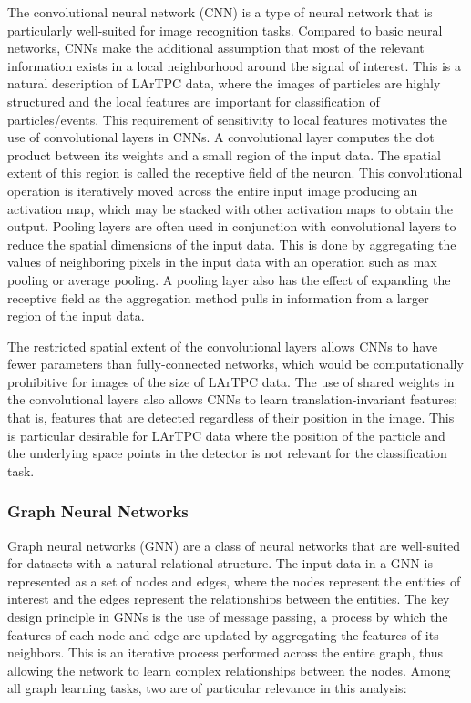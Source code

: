 The convolutional neural network (CNN) is a type of neural network that is particularly well-suited for image recognition tasks. Compared to basic neural networks, CNNs make the additional assumption that most of the relevant information exists in a local neighborhood around the signal of interest. This is a natural description of LArTPC data, where the images of particles are highly structured and the local features are important for classification of particles/events. This requirement of sensitivity to local features motivates the use of convolutional layers in CNNs. A convolutional layer computes the dot product between its weights and a small region of the input data. The spatial extent of this region is called the receptive field of the neuron. This convolutional operation is iteratively moved across the entire input image producing an activation map, which may be stacked with other activation maps to obtain the output. Pooling layers are often used in conjunction with convolutional layers to reduce the spatial dimensions of the input data. This is done by aggregating the values of neighboring pixels in the input data with an operation such as max pooling or average pooling. A pooling layer also has the effect of expanding the receptive field as the aggregation method pulls in information from a larger region of the input data.

The restricted spatial extent of the convolutional layers allows CNNs to have fewer parameters than fully-connected networks, which would be computationally prohibitive for images of the size of LArTPC data. The use of shared weights in the convolutional layers also allows CNNs to learn translation-invariant features; that is, features that are detected regardless of their position in the image. This is particular desirable for LArTPC data where the position of the particle and the underlying space points in the detector is not relevant for the classification task.

\subsubsection{Graph Neural Networks}
\label{sec:gnn}

Graph neural networks (GNN) are a class of neural networks that are well-suited for datasets with a natural relational structure. The input data in a GNN is represented as a set of nodes and edges, where the nodes represent the entities of interest and the edges represent the relationships between the entities. The key design principle in GNNs is the use of message passing, a process by which the features of each node and edge are updated by aggregating the features of its neighbors. This is an iterative process performed across the entire graph, thus allowing the network to learn complex relationships between the nodes. Among all graph learning tasks, two are of particular relevance in this analysis:

